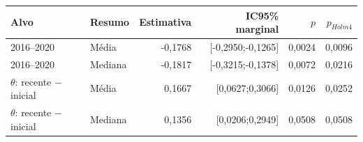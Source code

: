 \begin{tabular}{llrrrr}
\toprule
Alvo & Resumo & Estimativa & IC95\% marginal & $p$ & $p_{Holm4}$\\
\midrule
2016--2020 & Média & -0,1768 & [-0,2950;-0,1265] & 0,0024 & 0,0096\\
2016--2020 & Mediana & -0,1817 & [-0,3215;-0,1378] & 0,0072 & 0,0216\\
$\theta$: recente $-$ inicial & Média & 0,1667 & [0,0627;0,3066] & 0,0126 & 0,0252\\
$\theta$: recente $-$ inicial & Mediana & 0,1356 & [0,0206;0,2949] & 0,0508 & 0,0508\\
\bottomrule
\end{tabular}
